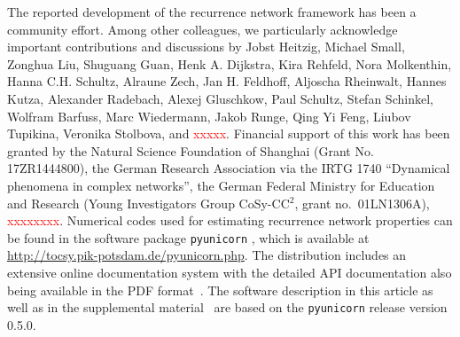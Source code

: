 \documentclass[3p,sort&compress]{elsarticle}
\begin{document}
The reported development of the recurrence network framework has been a community effort. Among other colleagues, we particularly acknowledge important contributions and discussions by Jobst Heitzig, Michael Small, Zonghua Liu, Shuguang Guan, Henk A. Dijkstra, Kira Rehfeld, Nora Molkenthin, Hanna C.H. Schultz, Alraune Zech, Jan H. Feldhoff, Aljoscha Rheinwalt, Hannes Kutza, Alexander Radebach, Alexej Gluschkow, Paul Schultz, Stefan Schinkel, Wolfram Barfuss, Marc Wiedermann, Jakob Runge, Qing Yi Feng, Liubov Tupikina, Veronika Stolbova, and \textcolor{red}{xxxxx}. Financial support of this work has been granted by  the Natural Science Foundation of Shanghai (Grant No. 17ZR1444800), the German Research Association via the IRTG 1740 ``Dynamical phenomena in complex networks'', the German Federal Ministry for Education and Research (Young Investigators Group CoSy-CC$^2$, grant no.~01LN1306A), \textcolor{red}{xxxxxxxx}. Numerical codes used for estimating recurrence network properties can be found in the software package \texttt{pyunicorn} \cite{Donges2015}, which is available at \url{http://tocsy.pik-potsdam.de/pyunicorn.php}. The distribution includes an extensive online documentation system with the detailed API documentation also being available in the PDF format~\cite{Supplement}. The software description in this article as well as in the supplemental material~\cite{Supplement} are based on the \texttt{pyunicorn} release version 0.5.0.

%
%

\end{document}
